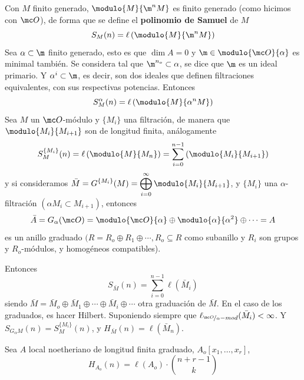 \begin{defi}
    Con $M$ finito generado, $\modulo{M}{\m^n M}$ es finito generado (como hicimos con $\mc O$), de forma que se define el \textbf{polinomio de Samuel} de $M$
    $$S_M(n) = \ell \left( \modulo{M}{\m^n M}\right)$$
    Sea $\alpha \subset \m$ finito generado, esto es que $\dim A = 0$ y $\m \in \modulo{\mc O}{\alpha}$ es minimal tambi\'en. Se considera tal que $\m^{n_o} \subset \alpha$, se dice que $\m$ es un ideal primario. Y $\alpha^i \subset \m$, es decir, son dos ideales que definen filtraciones equivalentes, con sus respectivas potencias. Entonces 
    $$S_M^{\alpha} (n) = \ell \left(\modulo{M}{\alpha^n M} \right)$$
    Sea $M$ un $\mc O$-m\'odulo y $\{M_i\}$ una filtraci\'on, de manera que $\modulo{M_i}{M_{i+1}}$ son de longitud finita, an\'alogamente
    $$S_{M}^{\{M_i\}}(n) = \ell\left( \modulo{M}{M_n} \right) = \sum_{i=0}^{n-1} \left( \modulo{M_i}{M_{i+1}} \right)$$
    y si consideramos $\displaystyle \bar M = G^{\{M_i\}}(M) = \bigoplus_{i=0}^{\infty} \modulo{M_i}{M_{i+1}}$, y $\{M_i\}$ una $\alpha$-filtraci\'on $(\alpha M_i \subset M_{i+1})$, entonces 
    $$\bar A = G_{\alpha}(\mc O) = \modulo{\mc O}{\alpha} \oplus \modulo{\alpha}{\alpha^2} \oplus \cdots =A$$
    es un anillo graduado $(R=R_o \oplus R_1 \oplus \cdots , R_o \subseteq R$ como subanillo y $R_i$ son grupos y $R_o$-m\'odulos, y homog\'eneos compatibles).

    Entonces 
    $$S_{\bar M}(n) = \sum_{i=0}^{n-1} \ell(\bar M_i)$$
    siendo $\bar M = \bar M_o \oplus \bar M_1 \oplus \cdots \oplus \bar M_{i} \oplus \cdots$ otra graduaci\'on de $\bar M$. En el caso de los graduados, es hacer Hilbert. Suponiendo siempre que $\ell_{\nicefrac{\mc O}{\alpha}-mod}(\bar M_i) < \infty$. Y $S_{G_{\alpha}M} (n) = S_M^{\{M_i\}}(n)$, y $H_{\bar M}(n) = \ell(\bar M_n)$. 
\end{defi}
\begin{lem}
Sea $A$ local noetheriano de longitud finita graduado, $A_o[x_1, \ldots, x_r]$, 
$$H_{A_o}(n) = \ell(A_o) \cdot \binom{n+r-1}{k}$$
\end{lem}

